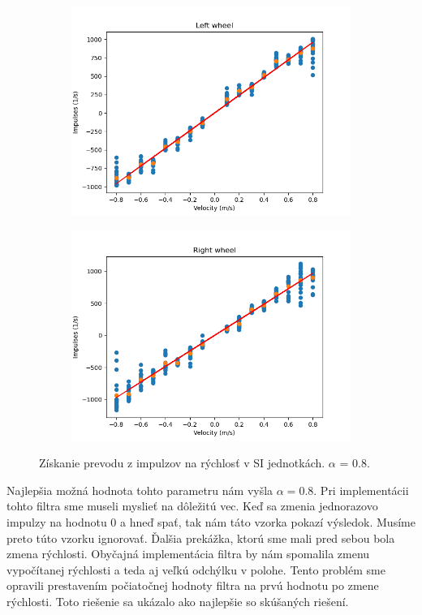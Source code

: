 \begin{figure}[!htbp]
	\begin{subfigure}{0.5\textwidth}
		\includegraphics[width=\textwidth]{img/lw_08100.png}
	\end{subfigure}
	\hfill
	\begin{subfigure}{0.5\textwidth}
		\includegraphics[width=\textwidth]{img/rw_08100.png}
	\end{subfigure}
	\caption{Získanie prevodu z impulzov na rýchlosť v SI jednotkách. \(\alpha\) = 0.8.}
	\label{fig:rw_lw_07250}
\end{figure}

\newpage

Najlepšia možná hodnota tohto parametru nám vyšla \(\alpha = 0.8\). Pri implementácii tohto filtra sme museli myslieť na dôležitú vec.
Keď sa zmenia jednorazovo impulzy na hodnotu 0 a hneď spať, tak nám táto vzorka pokazí výsledok. Musíme preto túto vzorku ignorovať. Ďalšia
prekážka, ktorú sme mali pred sebou bola zmena rýchlosti. Obyčajná implementácia filtra by nám spomalila zmenu vypočítanej rýchlosti
a teda aj veľkú odchýlku v polohe. Tento problém sme opravili prestavením počiatočnej hodnoty filtra na prvú hodnotu po zmene rýchlosti.
Toto riešenie sa ukázalo ako najlepšie so skúšaných riešení.

